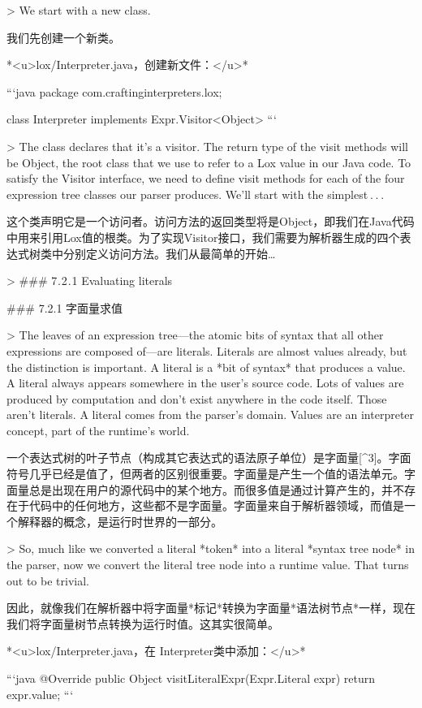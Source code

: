 \documentclass[cn,11pt,chinese]{elegantbook}
\begin{document}
> We start with a new class.

我们先创建一个新类。

*<u>lox/Interpreter.java，创建新文件：</u>*

```java
package com.craftinginterpreters.lox;

class Interpreter implements Expr.Visitor<Object> {
}
```

> The class declares that it’s a visitor. The return type of the visit methods will be Object, the root class that we use to refer to a Lox value in our Java code. To satisfy the Visitor interface, we need to define visit methods for each of the four expression tree classes our parser produces. We’ll start with the simplest . . . 

这个类声明它是一个访问者。访问方法的返回类型将是Object，即我们在Java代码中用来引用Lox值的根类。为了实现Visitor接口，我们需要为解析器生成的四个表达式树类中分别定义访问方法。我们从最简单的开始…

> ### 7 . 2 . 1 Evaluating literals

### 7.2.1 字面量求值

> The leaves of an expression tree—the atomic bits of syntax that all other expressions are composed of—are literals. Literals are almost values already, but the distinction is important. A literal is a *bit of syntax* that produces a value. A literal always appears somewhere in the user’s source code. Lots of values are produced by computation and don’t exist anywhere in the code itself. Those aren’t literals. A literal comes from the parser’s domain. Values are an interpreter concept, part of the runtime’s world.

一个表达式树的叶子节点（构成其它表达式的语法原子单位）是字面量[^3]。字面符号几乎已经是值了，但两者的区别很重要。字面量是产生一个值的语法单元。字面量总是出现在用户的源代码中的某个地方。而很多值是通过计算产生的，并不存在于代码中的任何地方，这些都不是字面量。字面量来自于解析器领域，而值是一个解释器的概念，是运行时世界的一部分。

> So, much like we converted a literal *token* into a literal *syntax tree node* in the parser, now we convert the literal tree node into a runtime value. That turns out to be trivial.

因此，就像我们在解析器中将字面量*标记*转换为字面量*语法树节点*一样，现在我们将字面量树节点转换为运行时值。这其实很简单。

*<u>lox/Interpreter.java，在 Interpreter类中添加：</u>*

```java
  @Override
  public Object visitLiteralExpr(Expr.Literal expr) {
    return expr.value;
  }
```
\end{document}
